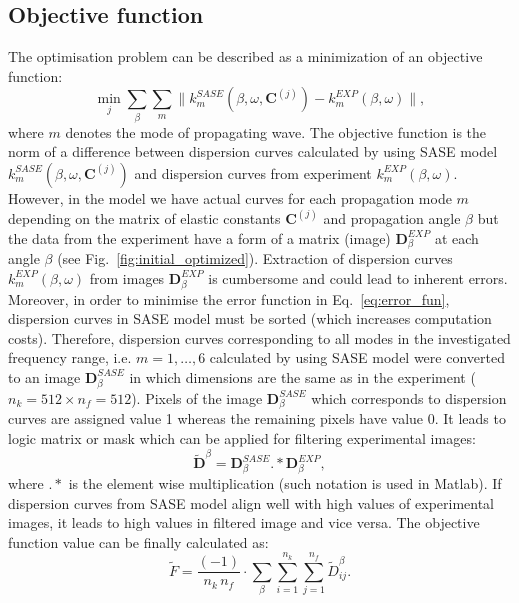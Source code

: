 \documentclass[preprint,12pt]{elsarticle}
\newcommand{\matr}[1]{\mathbf{#1}} %
\begin{document}
	\subsection{Objective function}
	The optimisation problem can be described as a minimization of an objective function:
	\begin{equation}
	\min_j \sum_{\beta}\sum_{m} \| k^{SASE}_{m}(\beta, \omega,\matr{C}^{(j)}) -k^{EXP}_{m}(\beta,\omega) \|,
	\label{eq:error_fun}
	\end{equation}
	where \(m\) denotes the mode of propagating wave.
	The objective function is the norm of a difference between dispersion curves 
	calculated by using SASE model \(k^{SASE}_{m}(\beta, \omega,\matr{C}^{(j)})\) and 
	dispersion curves from experiment \(k^{EXP}_{m}(\beta,\omega)\). However, in the 
	model we have actual curves for each propagation mode \(m\) depending on the 
	matrix of elastic constants \(\matr{C}^{(j)}\) and propagation angle \(\beta\) but the 
	data 
	from the experiment have a form of a matrix (image) \(\matr{D}^{EXP}_{\beta}\) at 
	each angle \(\beta\) (see Fig.~\ref{fig:initial_optimized}). Extraction of dispersion 
	curves \(k^{EXP}_{m}(\beta,\omega)\) from images \(\matr{D}^{EXP}_{\beta}\) is 
	cumbersome and could lead to inherent errors. Moreover, in order to minimise the 
	error function in Eq.~\ref{eq:error_fun}, dispersion curves in SASE model must be 
	sorted (which increases computation costs). Therefore, dispersion curves 
	corresponding to all modes in the investigated frequency range, i.e. \(m=1,\ldots, 6\) 
	calculated by using SASE model were converted to an image 
	\(\matr{D}^{SASE}_{\beta} \) in which dimensions are the same as in the experiment 
	(\(n_k=512 \times n_f= 512\)). Pixels of the image \(\matr{D}^{SASE}_{\beta} \) 
	which corresponds to dispersion curves are assigned value 1 whereas the remaining 
	pixels have value 0. It leads to logic matrix or mask which can be applied for filtering 
	experimental images: 
	\begin{equation}
		\tilde{\matr{D}}^{\beta} =  \matr{D}^{SASE}_{\beta}  .*    \matr{D}^{EXP}_{\beta} ,
		\label{eq:objective_fun}
   \end{equation}	
    where \(.*\) is the element wise multiplication (such notation is used in Matlab). If 
    dispersion curves from SASE model align well with high values of experimental 
    images, it leads to high values in filtered image and vice versa.
	The objective function value can be finally calculated as: 
	\begin{equation}
	\tilde{F} = \frac{(-1)}{n_k \, n_f}  \cdot \sum_{\beta}  \sum_{i=1}^{n_k} \sum_{j=1}^{n_f}	\tilde{D}_{ij}^{\beta}. 
	\end{equation}
\end{document}
